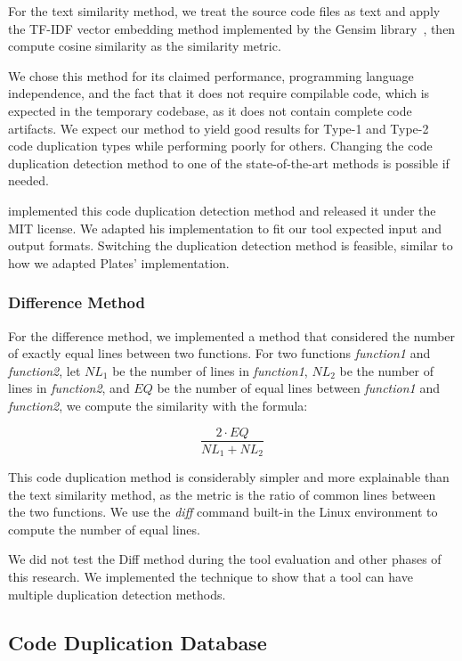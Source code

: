 For the text similarity method, we treat the source code files 
as text and apply the TF-IDF vector embedding method implemented by the 
Gensim library~\citep{gensim}, then compute cosine similarity as the 
similarity metric.

We chose this method for its claimed performance, 
programming language independence, and the fact that it does not require 
compilable code, which is expected in the temporary codebase, as it does 
not contain complete code artifacts. We expect our method to yield good 
results for Type-1 and Type-2 code duplication types while performing 
poorly for others. Changing the code duplication
detection method to one of the state-of-the-art methods is possible if needed.

\cite{platistool} implemented this code duplication detection method and 
released it under the MIT license. We adapted his 
implementation to fit our tool expected input and output formats. 
Switching the duplication detection method is feasible, similar to how 
we adapted Plates' implementation.

\subsubsection{Difference Method}

For the difference method, 
we implemented a method that considered the number of exactly equal lines between two functions.
For two functions \textit{function1} and \textit{function2}, let $NL_1$ be the number of lines in \textit{function1},
$NL_2$ be the number of lines in \textit{function2}, and $EQ$ be the number of equal lines between \textit{function1} and
\textit{function2}, we compute the similarity with the formula:

$$\frac{2 \cdot EQ}{NL_1 + NL_2}$$

This code duplication method is considerably simpler and more explainable than the text similarity method, 
as the metric is the ratio of common lines between the two functions. 
We use the \textit{diff} command built-in the Linux environment \citep{diffcommand}
to compute the number of equal lines.

We did not test the Diff method during the tool evaluation and other phases of this research. 
We implemented the technique to show that a tool can have multiple duplication detection methods.

\subsection{Code Duplication Database}

